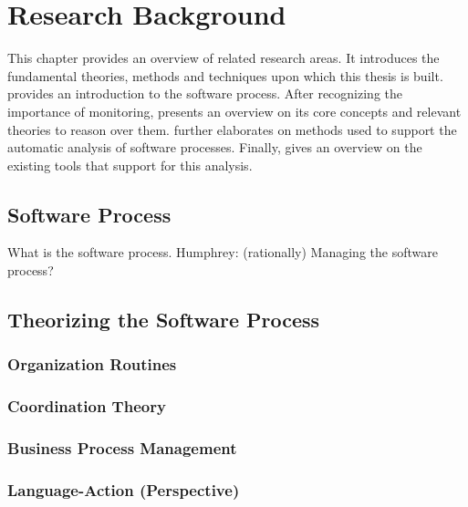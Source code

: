 \chapter{Research Background}
\label{ch2:problem-background}


This chapter provides an overview of related research areas. It introduces the fundamental theories, methods and techniques upon which this thesis is built.  provides an introduction to the software process. After recognizing the importance of monitoring,  presents an overview on its core concepts and relevant theories to reason over them.  further elaborates on methods used to support the automatic analysis of software processes. Finally,  gives an overview on the existing tools that support for this analysis.

\section{Software Process}
\label{sec:ch2-software-process}

What is the software process. Humphrey: (rationally) Managing the software process?

\section{Theorizing the Software Process}
\label{sec:ch2-theorizing}

\subsection{Organization Routines}
\label{subsec:org-stud}

\subsection{Coordination Theory}
\label{subsec:coordination-theory}

\subsection{Business Process Management}
\label{subsec:bpm}

\subsection{Language-Action (Perspective)}

